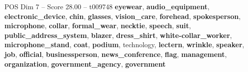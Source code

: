 \begin{textsample}{POS Dim 7 – Score 28.00 – t009748}  \label{ex:f7_pos_017}
\textbf{eyewear}, \textbf{audio\_equipment}, \textbf{electronic\_device}, \textbf{chin}, \textbf{glasses}, \textbf{vision\_care}, \textbf{forehead}, \textbf{spokesperson}, \textbf{microphone}, \textbf{collar}, \textbf{formal\_wear}, \textbf{necktie}, \textbf{speech}, \textbf{suit}, \textbf{public\_address\_system}, \textbf{blazer}, \textbf{dress\_shirt}, \textbf{white-collar\_worker}, \textbf{microphone\_stand}, \textbf{coat}, \textbf{podium}, technology, \textbf{lectern}, \textbf{wrinkle}, \textbf{speaker}, \textbf{job}, \textbf{official}, \textbf{businessperson}, \textbf{news\_conference}, \textbf{flag}, \textbf{management}, \textbf{organization}, \textbf{government\_agency}, \textbf{government}

\end{textsample}
